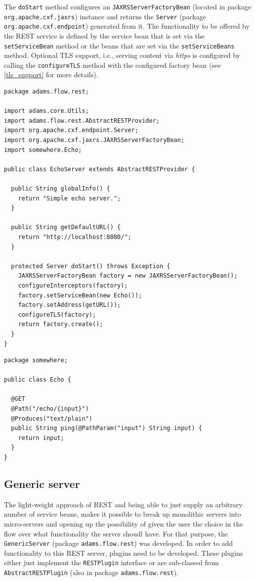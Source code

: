 \documentclass[a4paper]{book}
\begin{document}
The \verb|doStart| method configures an \verb|JAXRSServerFactoryBean| (located
in package \verb|org.apache.cxf.jaxrs|) instance and returns the
\verb|Server| (package \verb|org.apache.cxf.endpoint|) generated from it.
The functionality to be offered by the REST service is defined by the
service bean that is set via the \verb|setServiceBean| method or the beans
that are set via the \verb|setServiceBeans| method. Optional TLS support,
i.e., serving content via \textit{https} is configured by calling the \verb|configureTLS|
method with the configured factory bean (see \ref{tls_support} for more details).

{\scriptsize
\begin{verbatim}
package adams.flow.rest;

import adams.core.Utils;
import adams.flow.rest.AbstractRESTProvider;
import org.apache.cxf.endpoint.Server;
import org.apache.cxf.jaxrs.JAXRSServerFactoryBean;
import somewhere.Echo;

public class EchoServer extends AbstractRESTProvider {

  public String globalInfo() {
    return "Simple echo server.";
  }

  public String getDefaultURL() {
    return "http://localhost:8080/";
  }

  protected Server doStart() throws Exception {
    JAXRSServerFactoryBean factory = new JAXRSServerFactoryBean();
    configureInterceptors(factory);
    factory.setServiceBean(new Echo());
    factory.setAddress(getURL());
    configureTLS(factory);
    return factory.create();
  }
}
\end{verbatim}}

\clearpage
{\scriptsize
\begin{verbatim}
package somewhere;

public class Echo {

  @GET
  @Path("/echo/{input}")
  @Produces("text/plain")
  public String ping(@PathParam("input") String input) {
    return input;
  }
}
\end{verbatim}}

\subsection{Generic server}
The light-weight approach of REST and being able to just supply an arbitrary
number of service beans, makes it possible to break up monolithic servers
into micro-servers and opening up the possibility of given the user the choice
in the flow over what functionality the server shoudl have. For that purpose,
the \verb|GenericServer| (package \verb|adams.flow.rest|) was developed.
In order to add functionality to this REST server, plugins need to be developed.
These plugins either just implement the \verb|RESTPlugin| interface or are
sub-classed from \verb|AbstractRESTPlugin| (also in package \verb|adams.flow.rest|).
\end{document}

